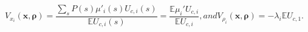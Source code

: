 \documentclass[thmsb,11pt]{article}
\begin{document}
\begin{subequations}
\begin{equation}
	V_{x_i}(\bm x,\bm \rho)= \frac{\sum_sP(s) \mu'_i(s) U_{c,i}(s)}{\mathbb E U_{c,i}(s)} = \frac{\mathbb E\mu_i' U_{c,i}}{\mathbb E U_{c,i}}\label{eq.env_x},
\end{equation}and
\begin{equation}
	V_{\rho_i}(\bm x,\bm \rho) = -\lambda_i \mathbb E U_{c,1}\label{eq.env_rho}.
 \end{equation}\end{subequations}

\end{document}
